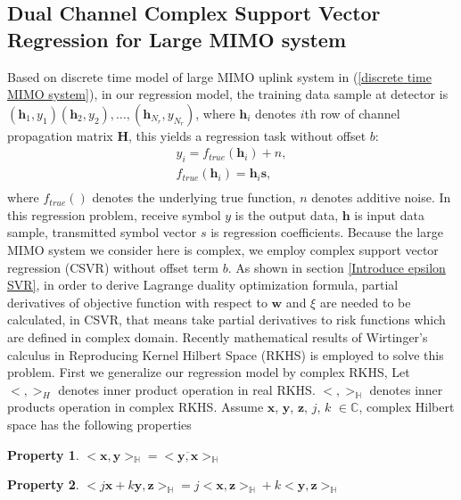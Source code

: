 \documentclass[12pt, draftclsnofoot, onecolumn]{IEEEtran}
\begin{document}
\begin{spacing}{2}
 
\section{Dual Channel Complex Support Vector Regression for Large MIMO system}\label{dual channel CSVR}
 Based on discrete time model of large MIMO uplink system in (\ref{discrete time MIMO system}), in our  regression model, the training data sample at detector is $(\mathbf{h}_{1}, y_{1})(\mathbf{h}_{2}, y_{2}), \ldots, (\mathbf{h}_{N_{r}}, y_{N_{r}})$, where $\mathbf{h}_{i}$ denotes $i$th row of channel propagation matrix $\mathbf{H}$, this yields a regression task without offset $b$:  
 \begin{eqnarray}
 y_{i}=f_{true}(\mathbf{h}_{i})+n,\\
 \label{regression part1a}
 f_{true}(\mathbf{h}_{i})=\mathbf{h}_{i}\mathbf{s},\\
 \label{regression part1b}
 \end{eqnarray}
 where $f_{true}()$ denotes the underlying true function, $n$ denotes additive noise.
In this regression problem, receive symbol $y$ is the output data, $\mathbf{h}$ is input data sample, transmitted symbol vector $s$ is regression coefficients. Because the large MIMO system we consider here is complex, we employ complex support vector regression (CSVR) without offset term $b$. As shown in section \ref{Introduce epsilon SVR}, in order to derive Lagrange duality optimization formula, partial derivatives of objective function with respect to $\mathbf{w}$ and $\xi$ are needed to be calculated, in CSVR, that means take partial derivatives to risk functions which are defined in complex domain. Recently mathematical results of Wirtinger's calculus in Reproducing Kernel Hilbert Space (RKHS) is employed to solve this problem\cite{bouboulis2011extension}. First we generalize our regression model by complex RKHS, 
Let $<,>_{H}$ denotes inner product operation in real RKHS. $<,>_{\mathbb{H}}$ denotes inner products operation in complex RKHS. Assume $\mathbf{x}$, $\mathbf{y}$, $\mathbf{z}$, $j$, $k$ $\in \mathbb{C}$, complex Hilbert space has the following properties 
\newtheorem{Lemma}{Lemma}
\newtheorem{Property}{Property}
\begin{Property}
 $<\mathbf{x},\mathbf{y}>_{\mathbb{H}}=<\overline{\mathbf{y},\mathbf{x}}>_{\mathbb{H}}$
\label{CHSProperty1}
\end{Property}

\begin{Property}
$<j\mathbf{x}+k\mathbf{y},\mathbf{z}>_{\mathbb{H}}=j<\mathbf{x},\mathbf{z}>_{\mathbb{H}}+k<\mathbf{y},\mathbf{z}>_{\mathbb{H}}$
\label{CHSProperty2}
\end{Property}


\end{spacing}
\end{document}

